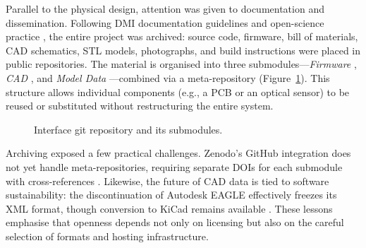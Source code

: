 Parallel to the physical design, attention was given to documentation and dissemination. Following DMI documentation guidelines \cite{calegario_documentation_2021} and open-science practice \cite{stall_journal_2023}, the entire project was archived: source code, firmware, bill of materials, CAD schematics, STL models, photographs, and build instructions were placed in public repositories. The material is organised into three submodules---\emph{Firmware} \cite{hamilton_firmware_2025}, \emph{CAD} \cite{hamilton_cad_2025}, and \emph{Model Data} \cite{hamilton_models_2025}---combined via a meta-repository (Figure~\ref{fig:repo-relation}). This structure allows individual components (e.g., a PCB or an optical sensor) to be reused or substituted without restructuring the entire system.

\begin{figure}
\centering
    \caption{Interface git repository and its submodules.}
    \label{fig:repo-relation}
\end{figure}

Archiving exposed a few practical challenges. Zenodo’s GitHub integration does not yet handle meta-repositories, requiring separate DOIs for each submodule with cross-references \cite{zenodo_1036_2025}. Likewise, the future of CAD data is tied to software sustainability: the discontinuation of Autodesk EAGLE \cite{autodesk_eagle_2024} effectively freezes its XML format, though conversion to KiCad remains available \cite{kicad_eagle_2024}. These lessons emphasise that openness depends not only on licensing but also on the careful selection of formats and hosting infrastructure.

